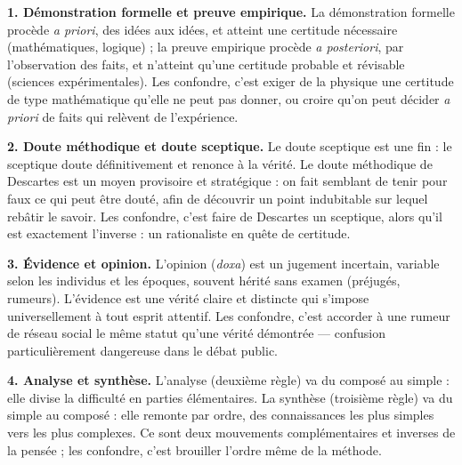\documentclass[11pt]{article}
\newcommand{\cle}[1]{{\popxbold\color{popdark}#1}}
\begin{document}
\begin{corrige}
\textbf{1. \cle{Démonstration formelle} et \cle{preuve empirique}.} La démonstration formelle procède \emph{a priori}, des idées aux idées, et atteint une certitude \cle{nécessaire} (mathématiques, logique) ; la preuve empirique procède \emph{a posteriori}, par l'observation des faits, et n'atteint qu'une certitude \cle{probable} et \cle{révisable} (sciences expérimentales). Les confondre, c'est exiger de la physique une certitude de type mathématique qu'elle ne peut pas donner, ou croire qu'on peut décider \emph{a priori} de faits qui relèvent de l'expérience.

\textbf{2. \cle{Doute méthodique} et \cle{doute sceptique}.} Le doute sceptique est une \cle{fin} : le sceptique doute définitivement et renonce à la vérité. Le doute méthodique de Descartes est un \cle{moyen} provisoire et stratégique : on fait semblant de tenir pour faux ce qui peut être douté, afin de découvrir un point indubitable sur lequel rebâtir le savoir. Les confondre, c'est faire de Descartes un sceptique, alors qu'il est exactement l'inverse : un \cle{rationaliste} en quête de certitude.

\textbf{3. \cle{Évidence} et \cle{opinion}.} L'opinion (\emph{doxa}) est un jugement \cle{incertain}, variable selon les individus et les époques, souvent hérité sans examen (préjugés, rumeurs). L'évidence est une vérité \cle{claire et distincte} qui s'impose \cle{universellement} à tout esprit attentif. Les confondre, c'est accorder à une rumeur de réseau social le même statut qu'une vérité démontrée — confusion particulièrement dangereuse dans le débat public.

\textbf{4. \cle{Analyse} et \cle{synthèse}.} L'analyse (deuxième règle) va du \cle{composé} au \cle{simple} : elle divise la difficulté en parties élémentaires. La synthèse (troisième règle) va du \cle{simple} au \cle{composé} : elle remonte par ordre, des connaissances les plus simples vers les plus complexes. Ce sont deux mouvements \cle{complémentaires} et \cle{inverses} de la pensée ; les confondre, c'est brouiller l'ordre même de la méthode.
\end{corrige}
\end{document}
